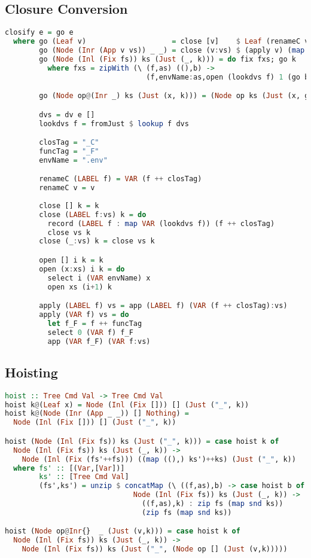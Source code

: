 \subsection{\label{subsection:closconvert}Closure Conversion}
\begin{lstlisting}[language=Haskell]
closify e = go e
  where go (Leaf v)                    = close [v]    $ Leaf (renameC v)
        go (Node (Inr (App v vs)) _ _) = close (v:vs) $ (apply v) (map renameC vs)
        go (Node (Inl (Fix fs)) ks (Just (_, k))) = do fix fxs; go k
          where fxs = zipWith (\ (f,as) ((),b) ->
                                 (f,envName:as,open (lookdvs f) 1 (go b))) fs ks

        go (Node op@(Inr _) ks (Just (x, k))) = (Node op ks (Just (x, go k)))

        dvs = dv e []
        lookdvs f = fromJust $ lookup f dvs

        closTag = "_C"
        funcTag = "_F"
        envName = ".env"

        renameC (LABEL f) = VAR (f ++ closTag)
        renameC v = v
        
        close [] k = k
        close (LABEL f:vs) k = do
          record (LABEL f : map VAR (lookdvs f)) (f ++ closTag)
          close vs k
        close (_:vs) k = close vs k

        open [] i k = k
        open (x:xs) i k = do
          select i (VAR envName) x
          open xs (i+1) k

        apply (LABEL f) vs = app (LABEL f) (VAR (f ++ closTag):vs)
        apply (VAR f) vs = do
          let f_F = f ++ funcTag
          select 0 (VAR f) f_F
          app (VAR f_F) (VAR f:vs)
\end{lstlisting}
\subsection{\label{subsection:hoist}Hoisting}
\begin{lstlisting}[language=Haskell]
hoist :: Tree Cmd Val -> Tree Cmd Val
hoist k@(Leaf x) = Node (Inl (Fix [])) [] (Just ("_", k))
hoist k@(Node (Inr (App _ _)) [] Nothing) =
  Node (Inl (Fix [])) [] (Just ("_", k))

hoist (Node (Inl (Fix fs)) ks (Just ("_", k))) = case hoist k of
  Node (Inl (Fix fs)) ks (Just (_, k)) ->
    Node (Inl (Fix (fs'++fs))) ((map ((),) ks')++ks) (Just ("_", k))
  where fs' :: [(Var,[Var])]
        ks' :: [Tree Cmd Val]
        (fs',ks') = unzip $ concatMap (\ ((f,as),b) -> case hoist b of
                              Node (Inl (Fix fs)) ks (Just (_, k)) ->
                                ((f,as),k) : zip fs (map snd ks))
                                (zip fs (map snd ks))

hoist (Node op@Inr{}  _ (Just (v,k))) = case hoist k of
  Node (Inl (Fix fs)) ks (Just (_, k)) ->
    Node (Inl (Fix fs)) ks (Just ("_", (Node op [] (Just (v,k)))))
\end{lstlisting}
